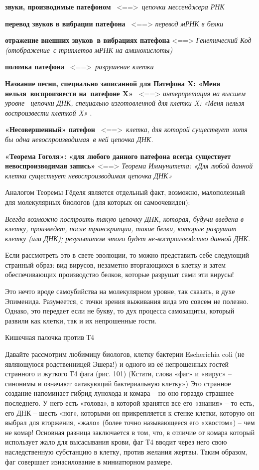 \documentclass[../main.tex]{subfiles}
\begin{document}
\textbf{звуки, производимые патефоном} ~\textless==\textgreater~\emph{цепочки мессенджера РНК}

\textbf{перевод звуков в вибрации патефона} ~\textless==\textgreater{} \emph{перевод мРНК в белки}

\textbf{отражение внешних звуков~в вибрациях патефона} \textless==\textgreater{} \emph{Генетический Код (отображение~с триплетов мРНК на аминокислоты)}

\textbf{поломка патефона} ~\textless==\textgreater~\emph{разрушение клетки}

\textbf{Название песни, специально записанной для Патефона X: «Меня нельзя~воспроизвести на~патефоне X»} ~\textless==\textgreater{} \emph{интерпретация на высшем уровне ~цепочки ДНК, специально изготовленной для клетки X: «Меня нельзя воспроизвести клеткой X»} .

\textbf{«Несовершенный» патефон} ~\textless==\textgreater~\emph{клетка, для которой существует~хотя бы одна невоспроизводимая~в ней цепочка ДНК.}

\textbf{«Теорема Гоголя»: «для любого данного патефона всегда существует невоспроизводимая запись»} \textless==\textgreater{} \emph{Теорема Иммунитета: «Для любой данной клетки существует невоспроизводимая цепочка ДНК»}

Аналогом Теоремы Гёделя является отдельный факт, возможно, малополезный для молекулярных биологов (для которых он самоочевиден):

\emph{Всегда возможно построить такую цепочку ДНК, которая, будучи введена в клетку, произведет, после транскрипции, такие белки, которые разрушат клетку (или ДНК); результатом этого будет не-воспроизводство данной ДНК.}

Если рассмотреть это в свете эволюции, то можно представить себе следующий странный образ: вид вирусов, незаметно вторгающихся в клетку и затем обеспечивающих производство белков, которые разрушат сами эти вирусы!

Это нечто вроде самоубийства на молекулярном уровне, так сказать, в духе Эпименида. Разумеется, с точки зрения выживания вида это совсем не полезно. Однако, это передает если не букву, то дух процесса самозащиты, который развили как клетки, так и их непрошенные гости.

Кишечная палочка против Т4

Давайте рассмотрим любимицу биологов, клетку бактерии Escherichia coli (не являющуюся родственницей Эшера!) и одного из её непрошенных гостей странного и жуткого Т4 фага (рис. 101) (Кстати, слова «фаг» и «вирус» \--- синонимы и означают «атакующий бактериальную клетку») Это странное создание напоминает гибрид лунохода и комара \--- но оно гораздо страшнее последнего. У него есть «голова», в которой хранятся все его «знания» \--- то есть, его ДНК \--- шесть «ног», которыми он прикрепляется к стенке клетки, которую он выбрал для вторжения, «жало» (более точно называющееся его «хвостом») \--- чем не комар! Основная разница заключается в том, что, в отличие от комара который использует жало для высасывания крови, фаг Т4 вводит через него свою наследственную субстанцию в клетку, против желания жертвы. Таким образом, фаг совершает изнасилование в миниатюрном размере.
\end{document}
